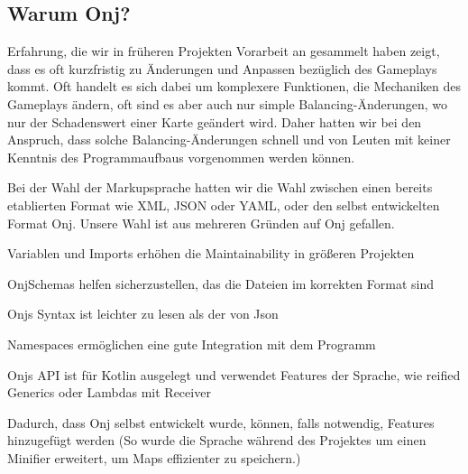 
\subsection{Warum Onj?}\label{subsec:warum-onj}

\renewcommand{\kapitelautor}{Autor: Marvin Kurka}

Erfahrung, die wir in früheren Projekten \bzw Vorarbeit an \FF gesammelt haben zeigt, dass
es oft kurzfristig zu Änderungen und Anpassen bezüglich des Gameplays kommt.
Oft handelt es sich dabei um komplexere Funktionen, die Mechaniken des Gameplays ändern, oft sind es aber auch nur
simple Balancing-Änderungen, wo \zB nur der Schadenswert einer Karte geändert wird.
Daher hatten wir bei \FF den Anspruch, dass solche Balancing-Änderungen schnell und von Leuten mit keiner Kenntnis
des Programmaufbaus vorgenommen werden können.

Bei der Wahl der Markupsprache hatten wir die Wahl zwischen einen bereits etablierten Format wie XML, JSON oder YAML,
oder den selbst entwickelten Format Onj.
Unsere Wahl ist aus mehreren Gründen auf Onj gefallen.

\begin{liste}
    \item Variablen und Imports erhöhen die Maintainability in größeren Projekten
    \item OnjSchemas helfen sicherzustellen, das die Dateien im korrekten Format sind
    \item Onjs Syntax ist leichter zu lesen als \zB der von Json
    \item Namespaces ermöglichen eine gute Integration mit dem Programm
    \item Onjs API ist für Kotlin ausgelegt und verwendet Features der Sprache, wie reified Generics oder
        Lambdas mit Receiver
    \item Dadurch, dass Onj selbst entwickelt wurde, können, falls notwendig, Features hinzugefügt werden (So wurde die
        Sprache \zB während des Projektes um einen Minifier erweitert, um Maps effizienter zu speichern.)
\end{liste}

\renewcommand{\kapitelautor}{}
